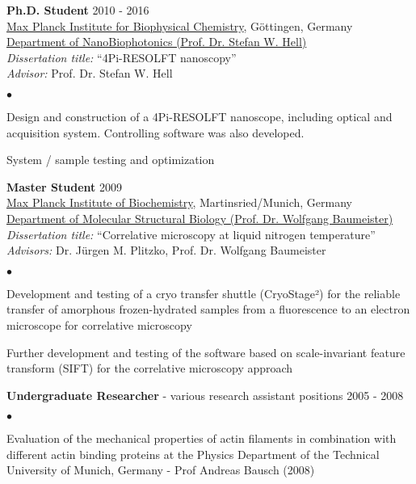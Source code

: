 \documentclass[margin,line]{res}
\newenvironment{list2}{
  \begin{list}{$\bullet$}{%
      \setlength{\itemsep}{0in}
      \setlength{\parsep}{0in} \setlength{\parskip}{0in}
      \setlength{\topsep}{0in} \setlength{\partopsep}{0in} 
      \setlength{\leftmargin}{0.2in}}}{\end{list}}
\begin{document}
\begin{resume}
{\bf Ph.D. Student} \hfill {2010 - 2016}\\
\href{https://www.mpibpc.mpg.de/en}{Max Planck Institute for Biophysical Chemistry}, Göttingen, Germany\\
\href{http://www.4pi.de/}{Department of NanoBiophotonics (Prof. Dr. Stefan W. Hell)}\\
{\it Dissertation title:} “4Pi-RESOLFT nanoscopy”\\
{\it Advisor:} Prof. Dr. Stefan W. Hell\\
\vspace*{-2mm}
\begin{list2}
\vspace*{-1mm}
\item Design and construction of a 4Pi-RESOLFT nanoscope, including optical and acquisition system. Controlling software was also developed. 
\item System / sample testing and optimization
\end{list2}
{\bf Master Student} \hfill {2009}\\
\href{https://www.biochem.mpg.de/en}{Max Planck Institute of Biochemistry}, Martinsried/Munich, Germany\\
\href{https://www.biochem.mpg.de/baumeister}{Department of Molecular Structural Biology (Prof. Dr. Wolfgang Baumeister)}\\
{\it Dissertation title:} “Correlative microscopy at liquid nitrogen temperature”\\
{\it Advisors:} Dr. Jürgen M. Plitzko, Prof. Dr. Wolfgang Baumeister\\
\vspace*{-2mm}
\begin{list2}
\vspace*{-1mm}
\item Development and testing of a cryo transfer shuttle (CryoStage²) for the reliable transfer of amorphous frozen-hydrated samples from a fluorescence to an electron microscope for correlative microscopy
\item Further development and testing of the software based on scale-invariant feature transform (SIFT) for the correlative microscopy approach
\end{list2}
{\bf Undergraduate Researcher} - various research assistant positions \hfill {2005 - 2008}\\
\vspace*{-2mm}
\begin{list2}
\vspace*{-1mm}
\item Evaluation of the mechanical properties of actin filaments in combination with different actin binding proteins at the Physics Department of the Technical University of Munich, Germany - Prof Andreas Bausch (2008)

\end{list2}
\end{resume}
\end{document}
